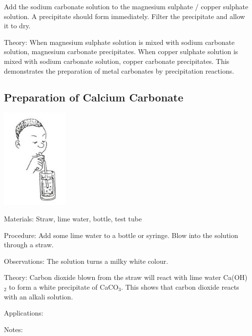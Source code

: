 \begin{multicols}{2}
\begin{description*}
{Add the sodium carbonate solution to the magnesium sulphate / copper sulphate solution. A precipitate should form immediately. Filter the precipitate and allow it to dry.}
\item[Theory:]{When magnesium sulphate solution is mixed with sodium carbonate solution, magnesium carbonate precipitates. When copper sulphate solution is
mixed with sodium carbonate solution, copper carbonate precipitates. This
demonstrates the preparation of metal carbonates by precipitation reactions.}
\end{description*}

\subsection{Preparation of Calcium Carbonate}

\begin{center}
\includegraphics[width=0.25\textwidth]{./img/source/limewater.jpg}
\end{center}

\begin{description*}
\item[Materials:]{Straw, lime water, bottle, test tube}
\item[Procedure:]{Add some lime water to a bottle or syringe. Blow into the solution through a straw.}
\item[Observations:]{The solution turns a milky white colour.}
\item[Theory:]{Carbon dioxide blown from the straw will react with lime water Ca(OH)$_2$ to
form a white precipitate of CaCO$_3$. This shows that carbon dioxide reacts
with an alkali solution.}
\item[Applications:]{}
\item[Notes:]{}
\end{description*}


\end{multicols}
